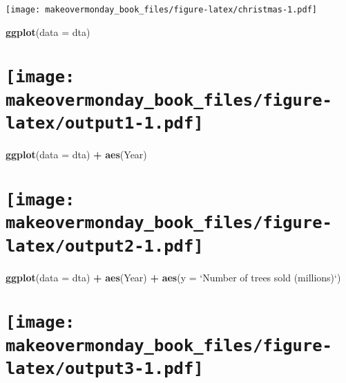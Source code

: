 \documentclass[]{book}
\newenvironment{Shaded}{\begin{snugshade}}{\end{snugshade}}
\newcommand{\KeywordTok}[1]{\textcolor[rgb]{0.13,0.29,0.53}{\textbf{#1}}}
\newcommand{\DataTypeTok}[1]{\textcolor[rgb]{0.13,0.29,0.53}{#1}}
\newcommand{\StringTok}[1]{\textcolor[rgb]{0.31,0.60,0.02}{#1}}
\newcommand{\OperatorTok}[1]{\textcolor[rgb]{0.81,0.36,0.00}{\textbf{#1}}}
\newcommand{\NormalTok}[1]{#1}
\theoremstyle{definition}
\theoremstyle{definition}
\theoremstyle{definition}
\theoremstyle{remark}
\begin{document}
\texttt{[image: makeovermonday\_book\_files/figure-latex/christmas-1.pdf]}

\clearpage

\begin{Shaded}
\begin{Highlighting}[]
\KeywordTok{ggplot}\NormalTok{(}\DataTypeTok{data =}\NormalTok{ dta) }
\end{Highlighting}
\end{Shaded}

\section[]{\texorpdfstring{\protect\texttt{[image: makeovermonday\_book\_files/figure-latex/output1-1.pdf]}}{}}\label{section-10}

\clearpage

\begin{Shaded}
\begin{Highlighting}[]
\KeywordTok{ggplot}\NormalTok{(}\DataTypeTok{data =}\NormalTok{ dta) }\OperatorTok{+}
\StringTok{  }\KeywordTok{aes}\NormalTok{(Year) }
\end{Highlighting}
\end{Shaded}

\section[]{\texorpdfstring{\protect\texttt{[image: makeovermonday\_book\_files/figure-latex/output2-1.pdf]}}{}}\label{section-11}

\clearpage

\begin{Shaded}
\begin{Highlighting}[]
\KeywordTok{ggplot}\NormalTok{(}\DataTypeTok{data =}\NormalTok{ dta) }\OperatorTok{+}
\StringTok{  }\KeywordTok{aes}\NormalTok{(Year) }\OperatorTok{+}
\StringTok{  }\KeywordTok{aes}\NormalTok{(}\DataTypeTok{y =} \StringTok{`}\DataTypeTok{Number of trees sold (millions)}\StringTok{`}\NormalTok{) }
\end{Highlighting}
\end{Shaded}

\section[]{\texorpdfstring{\protect\texttt{[image: makeovermonday\_book\_files/figure-latex/output3-1.pdf]}}{}}\label{section-12}

\clearpage
\end{document}
